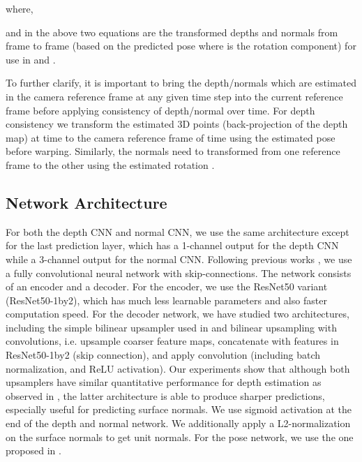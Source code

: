 \documentclass[letterpaper, 10 pt, conference]{ieeeconf}
\begin{document}
where, 


 and  in the above two equations are the transformed depths and normals from frame  to frame  (based on the predicted pose  where  is the rotation component) for use in  and .

To further clarify, it is important to bring the depth/normals which are estimated in the camera reference frame at any given time step into the current reference frame before applying consistency of depth/normal over time. For depth consistency we transform the estimated 3D points (back-projection of the depth map) at time  to the camera reference frame of time  using the estimated pose  before warping. Similarly, the normals need to transformed from one reference frame to the other using the estimated rotation .







\subsection{Network Architecture}
For both the depth CNN and normal CNN, we use the same architecture except for the last prediction layer, which has a 1-channel output for the depth CNN while a 3-channel output for the normal CNN. Following previous works \cite{garg2016depth}\cite{godard2016depth}\cite{zhan2018depthVO}, we use a fully convolutional neural network with skip-connections. 
The network consists of an encoder and a decoder. For the encoder, we use the ResNet50 \cite{he2016resnet} variant (ResNet50-1by2), which has much less learnable parameters and also faster computation speed. 
For the decoder network, we have studied two architectures, including the simple bilinear upsampler used in \cite{garg2016depth}\cite{zhan2018depthVO} and bilinear upsampling with convolutions, i.e. upsample coarser feature maps, concatenate with features in ResNet50-1by2 (skip connection), and apply convolution (including batch normalization, and ReLU activation). Our experiments show that although both upsamplers have similar quantitative performance for depth estimation as observed in \cite{zhan2018depthVO}, the latter architecture is able to produce sharper predictions, especially useful for predicting surface normals.
We use sigmoid activation at the end of the depth and normal network. We additionally apply a L2-normalization on the surface normals to get unit normals.
For the pose network, we use the one proposed in \cite{zhan2018depthVO}.
\end{document}
